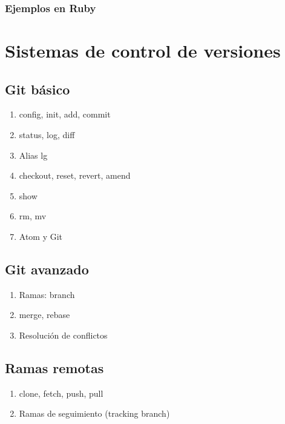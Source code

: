 \documentclass[a4paper,12pt,spanish]{sphinxmanual}
\begin{document}
\subsection{Ejemplos en Ruby}
\label{\detokenize{introduccion:ejemplos-en-ruby}}

\chapter{Sistemas de control de versiones}
\label{\detokenize{introduccion:sistemas-de-control-de-versiones}}

\section{Git básico}
\label{\detokenize{introduccion:git-basico}}\begin{enumerate}
\item {} 
config, init, add, commit

\item {} 
status, log, diff

\item {} 
Alias lg

\item {} 
checkout, reset, revert, \textendash{}amend

\item {} 
show

\item {} 
rm, mv

\item {} 
Atom y Git

\end{enumerate}


\section{Git avanzado}
\label{\detokenize{introduccion:git-avanzado}}\begin{enumerate}
\item {} 
Ramas: branch

\item {} 
merge, rebase

\item {} 
Resolución de conflictos

\end{enumerate}


\section{Ramas remotas}
\label{\detokenize{introduccion:ramas-remotas}}\begin{enumerate}
\item {} 
clone, fetch, push, pull

\item {} 
Ramas de seguimiento (tracking branch)

\end{enumerate}
\end{document}
